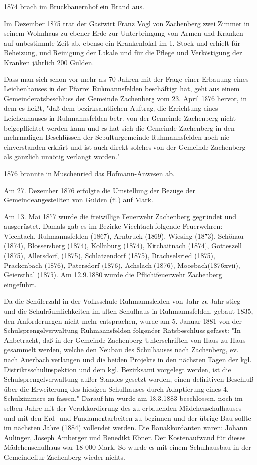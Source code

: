 1874 brach im Bruckbauernhof ein Brand aus.

Im Dezember 1875 trat der Gastwirt Franz Vogl von Zachenberg zwei Zimmer in
seinem Wohnhaus zu ebener Erde zur Unterbringung von Armen und Kranken auf
unbestimmte Zeit ab, ebenso ein Krankenlokal im 1. Stock und erhielt für
Beheizung, und Reinigung der Lokale und für die Pflege und Verköstigung der
Kranken jährlich 200 Gulden.

Dass man sich schon vor mehr als 70 Jahren mit der Frage einer Erbauung eines
Leichenhauses in der Pfarrei Ruhmannsfelden beschäftigt hat, geht aus einem
Gemeinderatsbeschluss der Gemeinde Zachenberg vom 23. April 1876 hervor, in dem
es heißt, "daß dem bezirksamtlichen Auftrag, die Errichtung eines Leichenhauses
in Ruhmannsfelden betr. von der Gemeinde Zachenberg nicht beigepflichtet werden
kann und es hat sich die Gemeinde Zachenberg in den mehrmaligen Beschlüssen der
Sepulturgemeinde Ruhmannsfelden noch nie einverstanden erklärt und ist auch
direkt solches von der Gemeinde Zachenberg als gänzlich unnötig verlangt
worden."

1876 brannte in Muschenried das Hofmann-Anwesen ab.

Am 27. Dezember 1876 erfolgte die Umstellung der Bezüge der Gemeindeangestellten
von Gulden (fl.) auf Mark.

Am 13. Mai 1877 wurde die freiwillige Feuerwehr Zachenberg gegründet und
ausgerüstet. Damals gab es im Bezirke Viechtach folgende Feuerwehren: Viechtach,
Ruhmannsfelden (1867), Arnbruck (1869), Wiesing (1873), Schönau (1874),
Blossersberg (1874), Kollnburg (1874), Kirchaitnach (1874), Gotteszell (1875),
Allersdorf, (1875), Schlatzendorf (1875), Drachselsried (1875), Prackenbach
(1876), Patersdorf (1876), Achslach (1876), Moosbach(1876xvii), Geiersthal
(1876). Am 12.9.1880 wurde die Pflichtfeuerwehr Zachenberg eingeführt.

Da die Schülerzahl in der Volksschule Ruhmannsfelden von Jahr zu Jahr stieg und
die Schulräumlichkeiten im alten Schulhaus in Ruhmannsfelden, gebaut 1835, den
Anforderungen nicht mehr entsprachen, wurde am 5. Januar 1881 von der
Schulsprengelverwaltung Ruhmannsfelden folgender Ratsbeschluss gefasst: "In
Anbetracht, daß in der Gemeinde Zachenberg Unterschriften von Haus zu Haus
gesammelt werden, welche den Neubau des Schulhauses nach Zachenberg, ev. nach
Auerbach verlangen und die beiden Projekte in den nächsten Tagen der kgl.
Distriktsschulinspektion und dem kgl. Bezirksamt vorgelegt werden, ist die
Schulsprengelverwaltung außer Standes gesetzt worden, einen definitiven Beschluß
über die Erweiterung des hiesigen Schulhauses durch Adaptierung eines 4.
Schulzimmers zu fassen." Darauf hin wurde am 18.3.1883 beschlossen, noch im
selben Jahre mit der Verakkordierung des zu erbauenden Mädchenschulhauses und
mit den Erd- und Fundamentarbeiten zu beginnen und der übrige Bau sollte im
nächsten Jahre (1884) vollendet werden. Die Bauakkordanten waren: Johann
Aulinger, Joseph Amberger und Benedikt Ebner. Der Kostenaufwand für dieses
Mädchenschulhaus war 18 000 Mark. So wurde es mit einem Schulhausbau in der
Gemeindeflur Zachenberg wieder nichts.

